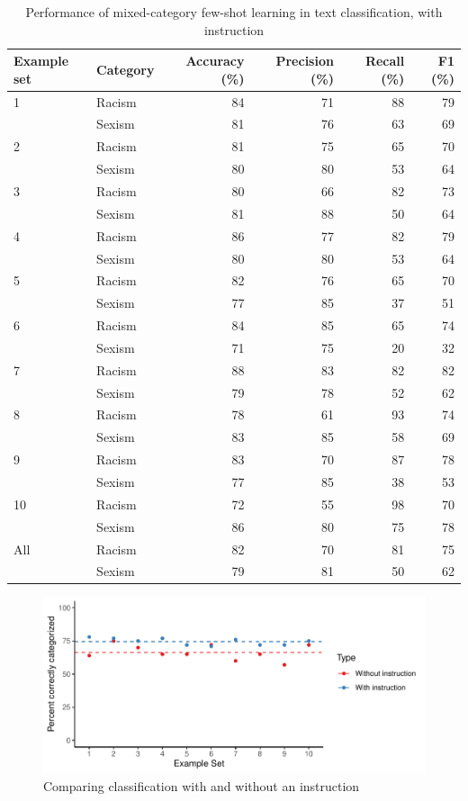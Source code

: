 \documentclass[12pt,]{article}
\begin{document}
\begin{table}

\caption{\label{tab:fewshotmixedinstruct-summary}Performance of mixed-category few-shot learning in text classification, with instruction}
\centering
\begin{tabular}[t]{llrrrr}
\toprule
Example set & Category & Accuracy (\%) & Precision (\%) & Recall (\%) & F1 (\%)\\
\midrule
1 & Racism & 84 & 71 & 88 & 79\\
 & Sexism & 81 & 76 & 63 & 69\\
\midrule
2 & Racism & 81 & 75 & 65 & 70\\
 & Sexism & 80 & 80 & 53 & \vphantom{1} 64\\
\midrule
3 & Racism & 80 & 66 & 82 & 73\\
 & Sexism & 81 & 88 & 50 & 64\\
\midrule
4 & Racism & 86 & 77 & 82 & 79\\
 & Sexism & 80 & 80 & 53 & 64\\
\midrule
5 & Racism & 82 & 76 & 65 & 70\\
 & Sexism & 77 & 85 & 37 & 51\\
\midrule
6 & Racism & 84 & 85 & 65 & 74\\
 & Sexism & 71 & 75 & 20 & 32\\
\midrule
7 & Racism & 88 & 83 & 82 & 82\\
 & Sexism & 79 & 78 & 52 & 62\\
\midrule
8 & Racism & 78 & 61 & 93 & 74\\
 & Sexism & 83 & 85 & 58 & 69\\
\midrule
9 & Racism & 83 & 70 & 87 & 78\\
 & Sexism & 77 & 85 & 38 & 53\\
\midrule
10 & Racism & 72 & 55 & 98 & 70\\
 & Sexism & 86 & 80 & 75 & 78\\
\midrule
All & Racism & 82 & 70 & 81 & 75\\
 & Sexism & 79 & 81 & 50 & 62\\
\bottomrule
\end{tabular}
\end{table}

\begin{figure}
\centering
\includegraphics{comparison-1.pdf}
\caption{\label{fig:comparison}Comparing classification with and without an instruction}
\end{figure}
\end{document}
